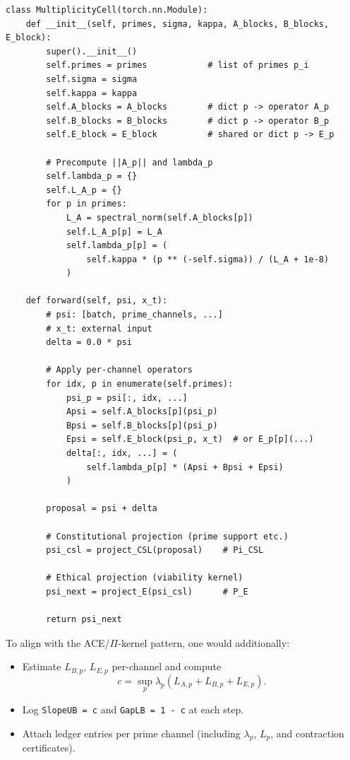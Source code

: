\documentclass[11pt]{article}
\begin{document}
\begin{verbatim}
class MultiplicityCell(torch.nn.Module):
    def __init__(self, primes, sigma, kappa, A_blocks, B_blocks, E_block):
        super().__init__()
        self.primes = primes            # list of primes p_i
        self.sigma = sigma
        self.kappa = kappa
        self.A_blocks = A_blocks        # dict p -> operator A_p
        self.B_blocks = B_blocks        # dict p -> operator B_p
        self.E_block = E_block          # shared or dict p -> E_p

        # Precompute ||A_p|| and lambda_p
        self.lambda_p = {}
        self.L_A_p = {}
        for p in primes:
            L_A = spectral_norm(self.A_blocks[p])
            self.L_A_p[p] = L_A
            self.lambda_p[p] = (
                self.kappa * (p ** (-self.sigma)) / (L_A + 1e-8)
            )

    def forward(self, psi, x_t):
        # psi: [batch, prime_channels, ...]
        # x_t: external input
        delta = 0.0 * psi

        # Apply per-channel operators
        for idx, p in enumerate(self.primes):
            psi_p = psi[:, idx, ...]
            Apsi = self.A_blocks[p](psi_p)
            Bpsi = self.B_blocks[p](psi_p)
            Epsi = self.E_block(psi_p, x_t)  # or E_p[p](...)
            delta[:, idx, ...] = (
                self.lambda_p[p] * (Apsi + Bpsi + Epsi)
            )

        proposal = psi + delta

        # Constitutional projection (prime support etc.)
        psi_csl = project_CSL(proposal)    # Pi_CSL

        # Ethical projection (viability kernel)
        psi_next = project_E(psi_csl)      # P_E

        return psi_next
\end{verbatim}

To align with the ACE/$\Pi$-kernel pattern, one would additionally:

\begin{itemize}[leftmargin=1.5em]
  \item Estimate $L_{B,p}$, $L_{E,p}$ per-channel and compute
  \[
    c = \sup_p \lambda_p (L_{A,p} + L_{B,p} + L_{E,p}).
  \]
  \item Log \texttt{SlopeUB = c} and \texttt{GapLB = 1 - c} at each step.
  \item Attach ledger entries per prime channel (including $\lambda_p$, $L_p$, and contraction certificates).
\end{itemize}
\end{document}
